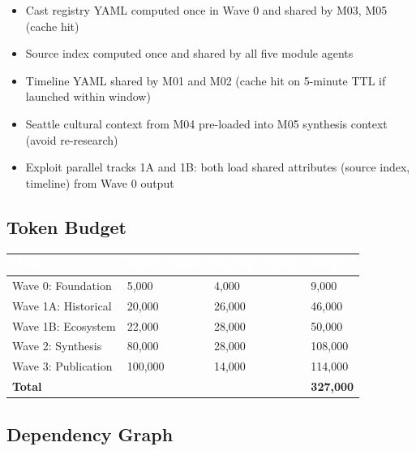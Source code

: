 \documentclass[11pt,letterpaper]{article}
\newcommand{\tableheader}[1]{\textbf{\sffamily\textcolor{white}{#1}}}
\begin{document}
\begin{itemize}[noitemsep]
  \item Cast registry YAML computed once in Wave 0 and shared by M03, M05 (cache hit)
  \item Source index computed once and shared by all five module agents
  \item Timeline YAML shared by M01 and M02 (cache hit on 5-minute TTL if launched within window)
  \item Seattle cultural context from M04 pre-loaded into M05 synthesis context (avoid re-research)
  \item Exploit parallel tracks 1A and 1B: both load shared attributes (source index, timeline) from Wave 0 output
\end{itemize}

\subsection{Token Budget}

\begin{center}
\begin{tabularx}{\textwidth}{L{4cm}C{2cm}C{2cm}C{2cm}}
\toprule
{}
\tableheader{Wave} & \tableheader{Input Tokens} & \tableheader{Output Tokens} & \tableheader{Total} \\
\midrule
Wave 0: Foundation & 5,000 & 4,000 & 9,000 \\
Wave 1A: Historical & 20,000 & 26,000 & 46,000 \\
Wave 1B: Ecosystem & 22,000 & 28,000 & 50,000 \\
Wave 2: Synthesis & 80,000 & 28,000 & 108,000 \\
Wave 3: Publication & 100,000 & 14,000 & 114,000 \\
\midrule
\textbf{Total} & & & \textbf{327,000} \\
\bottomrule
\end{tabularx}
\end{center}

\subsection{Dependency Graph}
\end{document}
